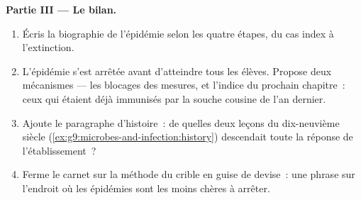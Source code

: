 \begin{problem}
\medskip\noindent\textbf{Partie III --- Le bilan.}
\begin{enumerate}[resume]
  \item Écris la biographie de l'épidémie selon les quatre
        étapes, du cas index à l'extinction.
  \item L'épidémie s'est arrêtée avant d'atteindre tous les
        élèves. Propose deux mécanismes --- les blocages
        des mesures, et l'indice du prochain chapitre~:
        ceux qui étaient déjà immunisés par la souche
        cousine de l'an dernier.
  \item Ajoute le paragraphe d'histoire~: de quelles deux
        leçons du dix-neuvième siècle
        (\cref{ex:g9:microbes-and-infection:history})
        descendait toute la réponse de l'établissement~?
  \item Ferme le carnet sur la méthode du crible en guise
        de devise~: une phrase sur l'endroit où les
        épidémies sont les moins chères à arrêter.
\end{enumerate}
\end{problem}
